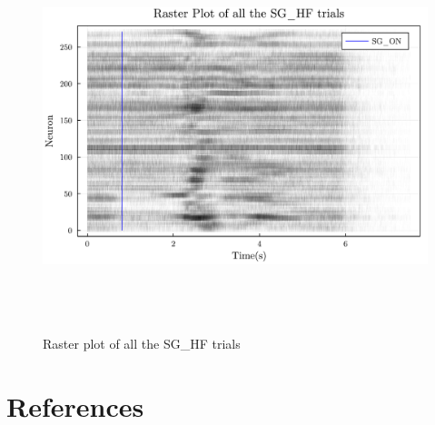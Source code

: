 \documentclass[9pt,twocolumn]{paper-template}
\begin{document}
\begin{figure}
	\centering
	\includegraphics[width=12cm,height=11.4cm]{../Assets/Q7RasterPlot4.pdf}
	\caption{Raster plot of all the SG\_HF trials}\label{fig:event_raster4}
\end{figure}
\section*{References}

\end{document}
